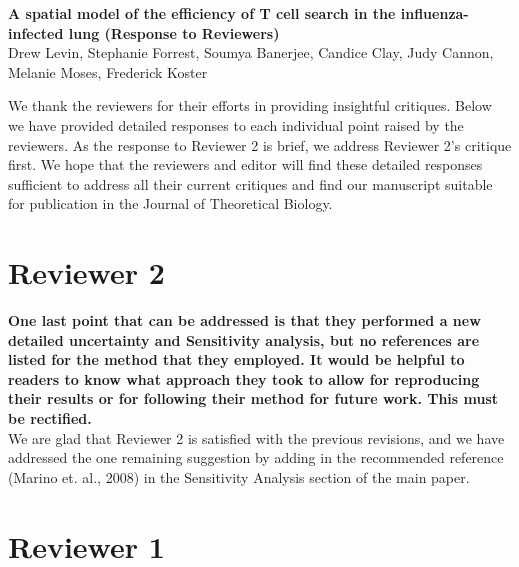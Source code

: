 \documentclass[10pt]{article}
\date{}
\newenvironment{response}{\fontfamily{cms}\selectfont\small}{\par}
\begin{document}
\begin{flushleft}
{\Large
\textbf{A spatial model of the efficiency of T cell search in the influenza-infected lung (Response to Reviewers)}
}
\\
Drew Levin, 
Stephanie Forrest, 
Soumya Banerjee,
Candice Clay,
Judy Cannon, 
Melanie Moses, 
Frederick Koster
\end{flushleft}
\vspace{0.5cm}


We thank the reviewers for their efforts in providing insightful critiques. Below we have provided detailed responses to each individual point raised by the reviewers. As the response to Reviewer 2 is brief, we address Reviewer 2's critique first. We hope that the reviewers and editor will find these detailed responses sufficient to address all their current critiques and find our manuscript suitable for publication in the Journal of Theoretical Biology. 

\section*{Reviewer 2}

\textbf{One last point that can be addressed is that they performed a new detailed uncertainty and Sensitivity analysis, but no references are listed for the method that they employed. It would be helpful to readers to know what approach they took to allow for reproducing their results or for following their method for future work. This must be rectified.} \\

\begin{response}
We are glad that Reviewer 2 is satisfied with the previous revisions, and we have addressed the one remaining suggestion by adding in the recommended reference (Marino et. al., 2008) in the Sensitivity Analysis section of the main paper.
\end{response}


\section*{Reviewer 1}
\end{document}
